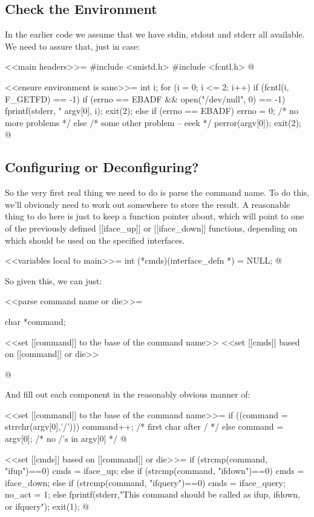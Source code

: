 \documentclass{article}
\begin{document}
\subsection{Check the Environment}

In the earlier code we assume that we have stdin, stdout and stderr all
available. We need to assure that, just in case:

<<main headers>>=
#include <unistd.h>
#include <fcntl.h>
@

<<ensure environment is sane>>=
{
	int i;
	for (i = 0; i <= 2; i++) {
		if (fcntl(i, F_GETFD) == -1) {
			if (errno == EBADF && open("/dev/null", 0) == -1) {
				fprintf(stderr,
					"%
					argv[0], i);
				exit(2);
			} else if (errno == EBADF) {
				errno = 0; /* no more problems */
			} else {
				/* some other problem -- eeek */
				perror(argv[0]);
				exit(2);
			}
		}
	}
}
@

\subsection{Configuring or Deconfiguring?}

So the very first real thing we need to do is parse the command name. To
do this, we'll obviously need to work out somewhere to store the result. A
reasonable thing to do here is just to keep a function pointer about,
which will point to one of the previously defined [[iface_up]] or
[[iface_down]] functions, depending on which should be used on the
specified interfaces.

<<variables local to main>>=
int (*cmds)(interface_defn *) = NULL;
@

So given this, we can just:

<<parse command name or die>>=
{
	char *command;

	<<set [[command]] to the base of the command name>>
	<<set [[cmds]] based on [[command]] or die>>
}
@

And fill out each component in the reasonably obvious manner of:

<<set [[command]] to the base of the command name>>=
if ((command = strrchr(argv[0],'/'))) {
	command++; /* first char after / */
} else {
	command = argv[0]; /* no /'s in argv[0] */
}
@

<<set [[cmds]] based on [[command]] or die>>=
if (strcmp(command, "ifup")==0) {
	cmds = iface_up;
} else if (strcmp(command, "ifdown")==0) {
	cmds = iface_down;
} else if (strcmp(command, "ifquery")==0) {
	cmds = iface_query;
	no_act = 1;
} else {
	fprintf(stderr,"This command should be called as ifup, ifdown, or ifquery\n");
	exit(1);
}
@ 
\end{document}
